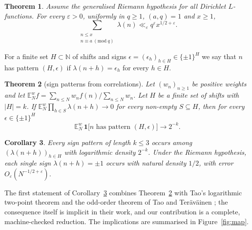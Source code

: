 \documentclass[11pt]{amsart}
\numberwithin{equation}{section}
\theoremstyle{plain}
\newtheorem{thm}{Theorem}[section]
\newtheorem{cor}[thm]{Corollary}
\theoremstyle{definition}
\theoremstyle{remark}
\newcommand{\N}{\mathbb{N}}
\newcommand{\E}{\mathbb{E}}
\begin{document}
\begin{thm}\label{thm:B}
Assume the generalised Riemann hypothesis for all Dirichlet $L$-functions. For every $\varepsilon>0$, uniformly in $q\ge1$, $(a,q)=1$ and $x\ge1$,
\[
\sum_{\substack{n\le x\\ n\equiv a\ (\mathrm{mod}\ q)}}\lambda(n)\ll_\varepsilon q^{\varepsilon}x^{1/2+\varepsilon}.
\]
\end{thm}

For a finite set $H\subset\N$ of shifts and signs $\epsilon=(\epsilon_h)_{h\in H}\in\{\pm1\}^H$ we say that $n$ has pattern $(H,\epsilon)$ if $\lambda(n+h)=\epsilon_h$ for every $h\in H$.

\begin{thm}[sign patterns from correlations]\label{thm:C}
Let $(w_n)_{n\ge1}$ be positive weights and let $\E^w_N f=\sum_{n\le N}w_nf(n)\big/\sum_{n\le N}w_n$. Let $H$ be a finite set of shifts with $|H|=k$. If
$\E^w_N\prod_{h\in S}\lambda(n+h)\to0$ for every non-empty $S\subseteq H$, then for every $\epsilon\in\{\pm1\}^H$
\[
\E^w_N\,\mathbf 1\big[n\text{ has pattern }(H,\epsilon)\big]\longrightarrow 2^{-k}.
\]
\end{thm}

\begin{cor}\label{cor:three}
Every sign pattern of length $k\le3$ occurs among $(\lambda(n+h))_{h\in H}$ with logarithmic density $2^{-k}$. Under the Riemann hypothesis, each single sign $\lambda(n+h)=\pm1$ occurs with natural density $1/2$, with error $O_\varepsilon(N^{-1/2+\varepsilon})$.
\end{cor}

The first statement of Corollary~\ref{cor:three} combines Theorem~\ref{thm:C} with Tao's logarithmic two-point theorem \cite{Tao16} and the odd-order theorem of Tao and Teräväinen \cite{TT18,TT19}; the consequence itself is implicit in their work, and our contribution is a complete, machine-checked reduction. The implications are summarised in Figure~\ref{fig:map}.
\end{document}
